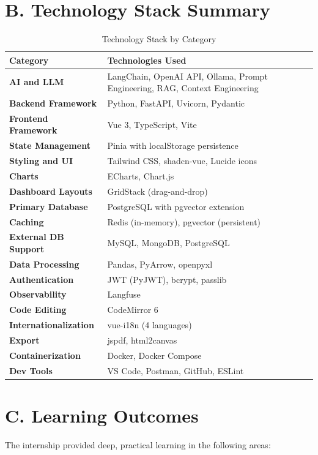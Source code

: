 \documentclass[12pt,a4paper]{report}
\begin{document}
\newpage
\section*{B. Technology Stack Summary}

\begin{table}[H]
\centering
\caption{Technology Stack by Category}
\begin{tabular}{>{\bfseries}p{4.5cm} p{8cm}}
\toprule
\textbf{Category} & \textbf{Technologies Used} \\
\midrule
AI and LLM & LangChain, OpenAI API, Ollama, Prompt Engineering, RAG, Context Engineering \\
Backend Framework & Python, FastAPI, Uvicorn, Pydantic \\
Frontend Framework & Vue 3, TypeScript, Vite \\
State Management & Pinia with localStorage persistence \\
Styling and UI & Tailwind CSS, shadcn-vue, Lucide icons \\
Charts & ECharts, Chart.js \\
Dashboard Layouts & GridStack (drag-and-drop) \\
Primary Database & PostgreSQL with pgvector extension \\
Caching & Redis (in-memory), pgvector (persistent) \\
External DB Support & MySQL, MongoDB, PostgreSQL \\
Data Processing & Pandas, PyArrow, openpyxl \\
Authentication & JWT (PyJWT), bcrypt, passlib \\
Observability & Langfuse \\
Code Editing & CodeMirror 6 \\
Internationalization & vue-i18n (4 languages) \\
Export & jspdf, html2canvas \\
Containerization & Docker, Docker Compose \\
Dev Tools & VS Code, Postman, GitHub, ESLint \\
\bottomrule
\end{tabular}
\label{tab:fullstack_appendix}
\end{table}

\newpage
\section*{C. Learning Outcomes}

The internship provided deep, practical learning in the following areas:
\end{document}
